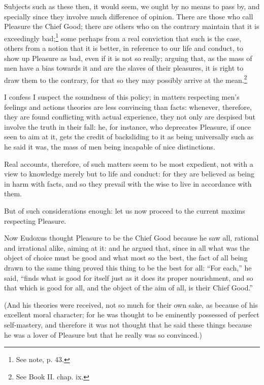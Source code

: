 Subjects such as these then, it would seem, we ought by no means to pass by,
and specially since they involve much difference of opinion. There are those
who call Pleasure the Chief Good; there are others who on the contrary maintain
that it is exceedingly bad;\footnote{See note, p. 43.}
some perhaps from a real conviction that such is the case, others from a notion
that it is better, in reference to our life and conduct, to show up Pleasure as
bad, even if it is not so really; arguing that, as the mass of men have a bias
towards it and are the slaves of their pleasures, it is right to draw them to
the contrary, for that so they may possibly arrive at the
mean.\footnote{See Book II. chap. ix.}

I confess I suspect the soundness of this policy; in matters respecting
men’s feelings and actions theories are less convincing than facts:
whenever, therefore, they are found conflicting with actual experience, they
not only are despised but involve the truth in their fall: he, for instance,
who deprecates Pleasure, if once seen to aim at it, gets the credit of
backsliding to it as being universally such as he said it was, the mass of men
being incapable of nice distinctions.

Real accounts, therefore, of such matters seem to be most expedient, not with a
view to knowledge merely but to life and conduct: for they are believed as
being in harm with facts, and so they prevail with the wise to live in
accordance with them.

But of such considerations enough: let us now proceed to the current maxims
respecting Pleasure.


Now Eudoxus thought Pleasure to be the Chief Good because he saw all, rational
and irrational alike, aiming at it: and he argued that, since in all what was
the object of choice must be good and what most so the best, the fact of all
being drawn to the same thing proved this thing to be the best for all:
“For each,” he said, “finds what is good for itself just as
it does its proper nourishment, and so that which is good for all, and the
object of the aim of all, is their Chief Good.”

(And his theories were received, not so much for their own sake, as because of
his excellent moral character; for he was thought to be eminently possessed of
perfect self-mastery, and therefore it was not thought that he said these
things because he was a lover of Pleasure but that he really was so convinced.)

